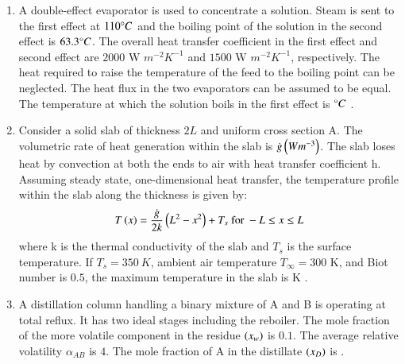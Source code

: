 \documentclass[journal,12pt,onecolumn]{IEEEtran}
\theoremstyle{remark}
\begin{document}
\begin{enumerate}
 

\item A double-effect evaporator is used to concentrate a solution. Steam is sent to the first effect at $110\degree C$ and the boiling point of the solution in the second effect is $63.3\degree C$. The overall heat transfer coefficient in the first effect and second effect are $2000$ W $m^{-2}K^{-1}$ and $1500$ W $m^{-2}K^{-1}$, respectively. The heat required to raise the temperature of the feed to the boiling point can be neglected. The heat flux in the two evaporators can be assumed to be equal. The temperature at which the solution boils in the first effect is \underline{\hspace{2cm}} $\degree C$ .
\hfill{}

 

\item Consider a solid slab of thickness $2L$ and uniform cross section A. The volumetric rate of heat generation within the slab is $\dot{g}\left(Wm^{-3}\right)$. The slab loses heat by convection at both the ends to air with heat transfer coefficient h. Assuming steady state, one-dimensional heat transfer, the temperature profile within the slab along the thickness is given by:
\begin{align*}
T\left(x\right) = \frac{\dot{g}}{2k}\left(L^{2}-x^{2}\right)+T_{s} \text{ for } -L\le x\le L
\end{align*}
where k is the thermal conductivity of the slab and $T_{s}$ is the surface temperature. If $T_{s}=350~K$, ambient air temperature $T_{\infty}=300$ K, and Biot number  is $0.5$, the maximum temperature in the slab is \underline{\hspace{2cm}} K .
\hfill{}

 

\item A distillation column handling a binary mixture of A and B is operating at total reflux. It has two ideal stages including the reboiler. The mole fraction of the more volatile component in the residue $\left(x_{w}\right)$ is $0.1$. The average relative volatility $\alpha_{AB}$ is $4$. The mole fraction of A in the distillate $\left(x_{D}\right)$ is \underline{\hspace{2cm}} .
\hfill{}

 


\end{enumerate}
\end{document}
